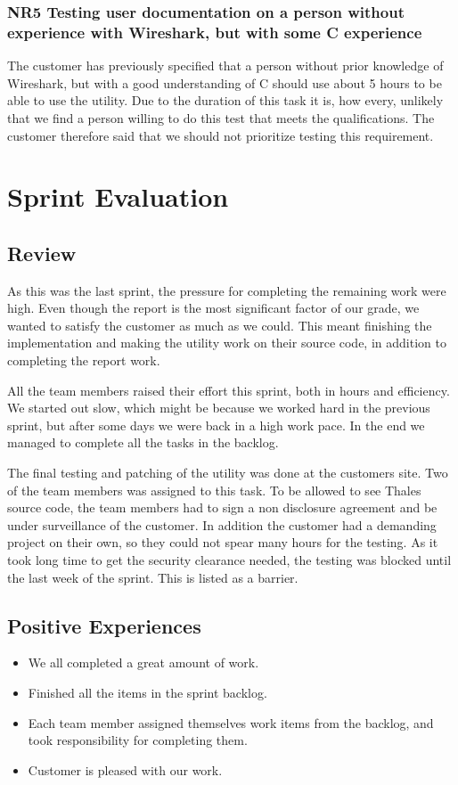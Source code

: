\subsubsection{NR5 Testing user documentation on a person without experience with Wireshark, but with some C experience}
The customer has previously specified that a person without prior knowledge of Wireshark, but with a good understanding of C should use about 5 hours to be able to use the utility. Due to the duration of this task it is, how every, unlikely that we find a person willing to do this test that meets the qualifications. The customer therefore said that we should not prioritize testing this requirement.

\section{Sprint Evaluation}
\label{sec:sp4eval}
\subsection{Review}
As this was the last sprint, the pressure for completing the remaining work were high. Even though the report is the most significant factor of our grade, we wanted to satisfy the customer as much as we could. This meant finishing the implementation and making the utility work on their source code, in addition to completing the report work.

All the team members raised their effort this sprint, both in hours and efficiency. We started out slow, which might be because we worked hard in the previous sprint, but after some days we were back in a high work pace. In the end we managed to complete all the tasks in the backlog.

The final testing and patching of the utility was done at the customers site. Two of the team members was assigned to this task. To be allowed to see Thales source code, the team members had to sign a non disclosure agreement and be under surveillance of the customer. In addition the customer had a demanding project on their own, so they could not spear many hours for the testing. As it took long time to get the security clearance needed, the testing was blocked until the last week of the sprint. This is listed as a barrier.

\subsection{Positive Experiences}
\begin{itemize}
\item We all completed a great amount of work.
\item Finished all the items in the sprint backlog.
\item Each team member assigned themselves work items from the backlog, and took responsibility for completing them.
\item Customer is pleased with our work.   
\end{itemize}

